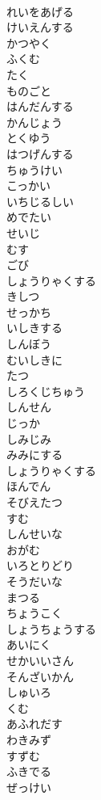 \documentclass[8pt]{extreport}
\begin{document}
\begin{CJK}{UTF8}{min}
\\	れいをあげる
\\	けいえんする
\\	かつやく
\\	ふくむ
\\	たく
\\	ものごと
\\	はんだんする
\\	かんじょう
\\	とくゆう
\\	はつげんする
\\	ちゅうけい
\\	こっかい
\\	いちじるしい
\\	めでたい
\\	せいじ
\\	むす
\\	ごび
\\	しょうりゃくする
\\	きしつ
\\	せっかち
\\	いしきする
\\	しんぼう
\\	むいしきに
\\	たつ
\\	しろくじちゅう
\\	しんせん
\\	じっか
\\	しみじみ
\\	みみにする
\\	しょうりゃくする
\\	ほんでん
\\	そびえたつ
\\	すむ
\\	しんせいな
\\	おがむ
\\	いろとりどり
\\	そうだいな
\\	まつる
\\	ちょうこく
\\	しょうちょうする
\\	あいにく
\\	せかいいさん
\\	そんざいかん
\\	しゅいろ
\\	くむ
\\	あふれだす
\\	わきみず
\\	すずむ
\\	ふきでる
\\	ぜっけい

\end{CJK}
\end{document}
